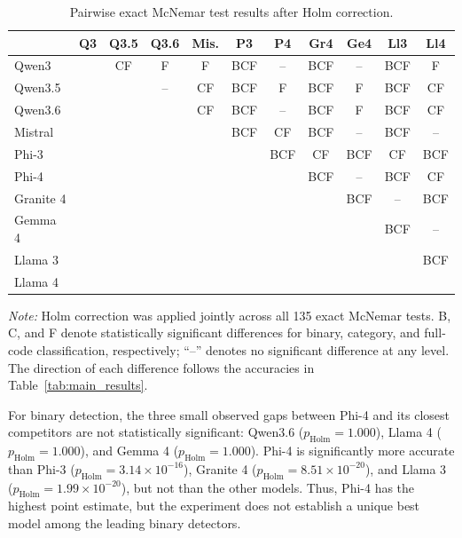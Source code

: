 \documentclass[a4paper]{article}
\begin{document}
\begin{table}[t]
\centering
\caption{Pairwise exact McNemar test results after Holm correction.}
\label{tab:mcnemar_matrix}
\normalsize
\renewcommand{\arraystretch}{1.12}
\setlength{\tabcolsep}{3.2pt}
\begin{tabular}{lcccccccccc}
\toprule
 & \textbf{Q3} & \textbf{Q3.5} & \textbf{Q3.6} & \textbf{Mis.} & \textbf{P3} & \textbf{P4} & \textbf{Gr4} & \textbf{Ge4} & \textbf{Ll3} & \textbf{Ll4} \\
\midrule
Qwen3     &       & CF    & F     & F     & BCF   & --    & BCF   & --    & BCF   & F   \\
Qwen3.5   &       &       & --    & CF    & BCF   & F     & BCF   & F     & BCF   & CF  \\
Qwen3.6   &       &       &       & CF    & BCF   & --    & BCF   & F     & BCF   & CF  \\
Mistral   &       &       &       &       & BCF   & CF    & BCF   & --    & BCF   & --  \\
Phi-3     &       &       &       &       &       & BCF   & CF    & BCF   & CF    & BCF \\
Phi-4     &       &       &       &       &       &       & BCF   & --    & BCF   & CF  \\
Granite 4 &       &       &       &       &       &       &       & BCF   & --    & BCF \\
Gemma 4   &       &       &       &       &       &       &       &       & BCF   & --  \\
Llama 3   &       &       &       &       &       &       &       &       &       & BCF \\
Llama 4   &       &       &       &       &       &       &       &       &       &     \\
\bottomrule
\end{tabular}
\vspace{2pt}

\begin{minipage}{0.98\textwidth}
\footnotesize
\textit{Note:} Holm correction was applied jointly across all 135 exact McNemar tests. B, C, and F denote statistically significant differences for binary, category, and full-code classification, respectively; ``--'' denotes no significant difference at any level. The direction of each difference follows the accuracies in Table~\ref{tab:main_results}.
\end{minipage}
\end{table}

For binary detection, the three small observed gaps between Phi-4 and its closest competitors are not statistically significant: Qwen3.6 ($p_{\mathrm{Holm}}=1.000$), Llama 4 ($p_{\mathrm{Holm}}=1.000$), and Gemma 4 ($p_{\mathrm{Holm}}=1.000$). Phi-4 is significantly more accurate than Phi-3 ($p_{\mathrm{Holm}}=3.14\times10^{-16}$), Granite 4 ($p_{\mathrm{Holm}}=8.51\times10^{-20}$), and Llama 3 ($p_{\mathrm{Holm}}=1.99\times10^{-20}$), but not than the other models. Thus, Phi-4 has the highest point estimate, but the experiment does not establish a unique best model among the leading binary detectors.
\end{document}

